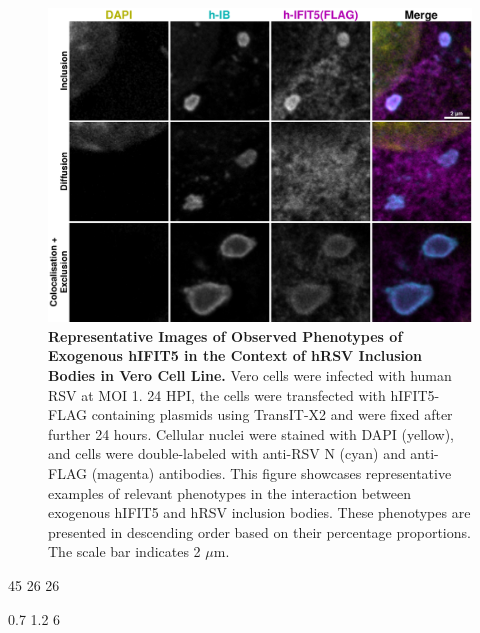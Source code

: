 \begin{figure}
    \centering
    \includegraphics[width=1\linewidth]{09. Chapter 4/Figs/02. Overexpression/04. IFIT5/03. i5-hrsv.pdf}
    \caption[Representative Images of Observed Phenotypes of Exogenous hIFIT5 in the Context of hRSV Inclusion Bodies in Vero Cell Line.]{\textbf{Representative Images of Observed Phenotypes of Exogenous hIFIT5 in the Context of hRSV Inclusion Bodies in Vero Cell Line.} Vero cells were infected with human RSV at MOI 1. 24 HPI, the cells were transfected with hIFIT5-FLAG containing plasmids using TransIT-X2 and were fixed after further 24 hours. Cellular nuclei were stained with DAPI (yellow), and cells were double-labeled with anti-RSV N (cyan) and anti-FLAG (magenta) antibodies. This figure showcases representative examples of relevant phenotypes in the interaction between exogenous hIFIT5 and hRSV inclusion bodies. These phenotypes are presented in descending order based on their percentage proportions. The scale bar indicates 2 \(\mu \mbox{m}\).}
    \label{fig:Representative Images of Observed Phenotypes of Exogenous hIFIT5 in the Context of hRSV Inclusion Bodies in VERO Cell Line}
\end{figure}

45 26 26

0.7 1.2 6

